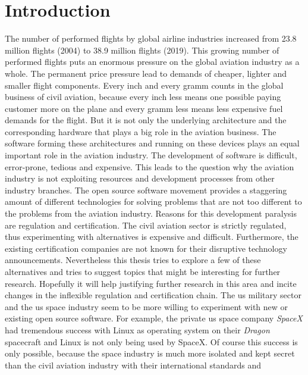 \documentclass[titlepage]{report}
\begin{document}
\chapter{Introduction}\label{chapter:introduction}
\setcounter{page}{1}
The number of performed flights by global airline industries increased from 23.8 million flights (2004)
to 38.9 million flights (2019)\cite{STATISTA}. This growing number of performed flights puts an enormous
pressure on the global aviation industry as a whole. The permanent price pressure lead to demands of
cheaper, lighter and smaller flight components\cite{prisaznuk1992integrated}. Every inch and every gramm 
counts in the global business of civil aviation, because every inch less means one possible paying customer 
more on the plane and every gramm less means less expensive fuel demands for the flight. But it is not only
the underlying architecture and the corresponding hardware that plays a big role in the aviation business.
The software forming these architectures and running on these devices plays an equal important role
in the aviation industry. The development of software is difficult, error-prone, tedious and expensive. This leads
to the question why the aviation industry is not exploiting resources and development processes from other industry branches.
The open source software movement provides a staggering amount of different technologies for solving problems
that are not too different to the problems from the aviation industry. Reasons for this development paralysis
are regulation and certification. The civil aviation sector is strictly regulated, thus experimenting with alternatives
is expensive and difficult. Furthermore, the existing certification companies are not known for their disruptive
technology announcements. Nevertheless this thesis tries to explore a few of these alternatives and tries to
suggest topics that might be interesting for further research. Hopefully it will help justifying further research
in this area and incite changes in the inflexible regulation and certification chain. The \gls{us} military sector 
and the \gls{us} space industry seem to be more willing to experiment with new or existing open source software. 
For example, the private \gls{us} space company \emph{SpaceX} had tremendous success with Linux as operating 
system on their \emph{Dragon} spacecraft\cite{gruen2012linux} and Linux is not only being used by 
SpaceX\cite{leppinen2017current}. Of course this success is only possible, because the space industry 
is much more isolated and kept secret than the civil aviation industry with their international standards and 
\end{document}
